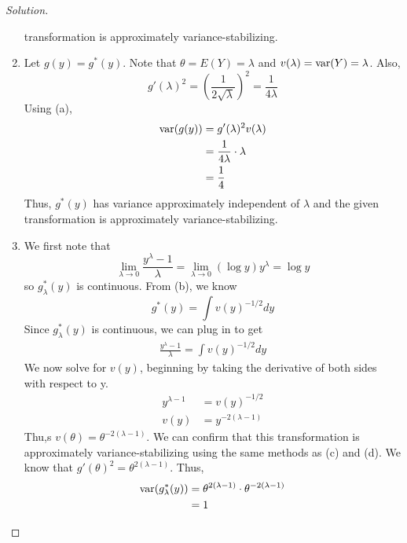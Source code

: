\documentclass[letterpaper, 12pt]{article}
\newcommand{\vari}{\textnormal{var}}
\begin{document}
\begin{proof}[Solution]
\begin{enumerate}
            transformation is approximately variance-stabilizing.
        \item Let $g(y) = g^*(y)$. 
            Note that $\theta = E(Y) = \lambda$ and $v(\lambda) = \vari(Y) = \lambda$. Also,
            $$g'(\lambda)^2 = \left(\frac{1}{2\sqrt{\lambda}}\right)^2 = \frac{1}{4\lambda}$$ 
            Using (a), 
            \begin{align*}
                \vari(g(y)) &= g'(\lambda)^2 v(\lambda) \\ 
                              &= \frac{1}{4\lambda} \cdot \lambda \\ 
                              &= \frac{1}{4}
            \end{align*}
            Thus, $g^*(y)$ has variance approximately independent of $\lambda$ and the given
            transformation is approximately variance-stabilizing.
        \item We first note that 
            $$\lim_{\lambda \to 0} \frac{y^{\lambda} - 1}{\lambda} = \lim_{\lambda \to 0} (\log
            y)y^{\lambda} = \log y$$ 
            so $g_\lambda^*(y)$ is continuous.
            From (b), we know 
            $$g^*(y) = \int v(y)^{-1/2} dy$$ 
            Since $g_\lambda^*(y)$ is continuous, we can plug in to get
            \begin{align*}
                \frac{y^{\lambda} - 1}{\lambda} = \int v(y)^{-1/2} dy 
            \end{align*}
            We now solve for $v(y)$, beginning by taking the derivative of both sides with respect
            to y.
            \begin{align*}
                y^{\lambda - 1} &= v(y)^{-1/2} \\ 
                v(y) &= y^{-2(\lambda - 1)}
            \end{align*}
            Thu,s $v(\theta) = \theta^{-2(\lambda - 1)}$. We can confirm that this transformation is
            approximately variance-stabilizing using the same methods as (c) and (d). We know that
            $g'(\theta)^2 = \theta^{2(\lambda - 1)}$. Thus, 
            \begin{align*}
                \vari(g_\lambda^*(y)) &= \theta^{2(\lambda - 1)} \cdot \theta^{-2(\lambda - 1)} \\ 
                                      &= 1
            \end{align*}
    \end{enumerate}
\end{proof}
\end{document}
